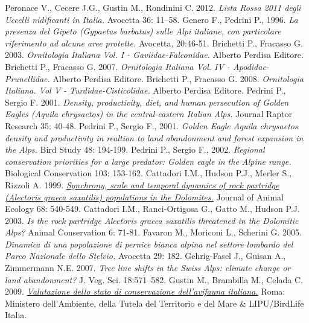 \documentclass[10pt,twoside,openany,x11names,svgnames,italian,a5paper,dvipsnames,table]{memoir}
\begin{document}
\begin{thebibliography}{9}
Peronace V., Cecere J.G., Gustin M., Rondinini C. 2012. \emph{Lista Rossa 2011 degli Uccelli nidificanti in Italia.} Avocetta 36: 11–58.
Genero F., Pedrini P., 1996. \emph{La presenza del Gipeto (\emph{Gypaetus barbatus}) sulle Alpi italiane, con particolare riferimento ad alcune aree protette.} Avocetta, 20:46-51. 
Brichetti P., Fracasso G. 2003. \emph{Ornitologia Italiana Vol. I - \emph{Gaviidae-Falconidae}.} Alberto Perdisa Editore.
Brichetti P., Fracasso G. 2007. \emph{Ornitologia Italiana Vol. IV - \emph{Apodidae-Prunellidae}.} Alberto Perdisa Editore.
Brichetti P., Fracasso G. 2008. \emph{Ornitologia Italiana. Vol V - \emph{Turdidae-Cisticolidae}.} Alberto Perdisa Editore.
Pedrini P., Sergio F. 2001. \emph{Density, productivity, diet, and human persecution of Golden Eagles (\emph{Aquila chrysaetos}) in the central-eastern Italian Alps.} Journal Raptor Research 35: 40-48.
Pedrini P., Sergio F., 2001. \emph{Golden Eagle Aquila chrysaetos density and productivity in realtion to land abandonment and forest expansion in the Alps.} Bird Study 48: 194-199.
Pedrini P., Sergio F., 2002. \emph{Regional conservation priorities for a large predator: Golden eagle in the Alpine range.} Biological Conservation 103: 153-162.
Cattadori I.M., Hudson P.J., Merler S., Rizzoli A. 1999. \href{http://onlinelibrary.wiley.com/doi/10.1046/j.1365-2656.1999.00302.x/pdf}{\emph{Synchrony, scale and temporal dynamics of rock partridge (\emph{Alectoris graeca saxatilis}) populations in the Dolomites.}} Journal of Animal Ecology 68: 540-549.
Cattadori I.M., Ranci-Ortigosa G., Gatto M., Hudson P.J. 2003. \emph{Is the rock partridge \emph{Alectoris graeca saxatilis} threatened in the Dolomitic Alps?} Animal Conservation 6: 71-81.
Favaron M., Moriconi L., Scherini G. 2005. \emph{Dinamica di una popolazione di pernice bianca alpina nel settore lombardo del Parco Nazionale dello Stelvio.} Avocetta 29: 182.
Gehrig-Fasel J., Guisan A., Zimmermann N.E. 2007. \emph{Tree line shifts in the Swiss Alps: climate change or land abandonment?} J. Veg. Sci. 18:571–582.
Gustin M., Brambilla M., Celada C. 2009. \href{http://www.uccellidaproteggere.it/content/download/4210/46448/file/valutazione_avifauna_italiana_volumeI.pdf}{\emph{Valutazione dello stato di conservazione dell’avifauna italiana.}} Roma: Ministero dell’Ambiente, della Tutela del Territorio e del Mare \& LIPU/BirdLife Italia.

\end{thebibliography}
\end{document}
